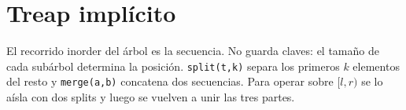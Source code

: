 \section{Treap impl\'icito}

El recorrido inorder del \'arbol es la secuencia. No guarda claves: el tama\~no
de cada sub\'arbol determina la posici\'on. \texttt{split(t,k)} separa los
primeros $k$ elementos del resto y \texttt{merge(a,b)} concatena dos secuencias.
Para operar sobre $[l,r)$ se lo a\'isla con dos splits y luego se vuelven a unir
las tres partes.


